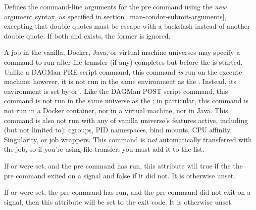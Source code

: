\begin{description}
\item[\AdAttr{PreArguments}:] Defines the command-line arguments for the
pre command using the \emph{new} argument syntax, as specified in
section~\ref{man-condor-submit-arguments}, excepting that double quotes must
be escape with a backslash instead of another double quote. If both
 and  exists, the former is ignored.

\label{PreCmd}
\item[\AdAttr{PreCmd}:] A job in the vanilla, Docker, Java, or virtual machine
universes may specify a command to run after file transfer (if any) completes
but before the  is started. Unlike a DAGMan PRE script
command, this command \emph{is} run on the execute machine; however, it
is not run in the same environment as the .  Instead,
its environment is set by  or .  Like
the DAGMan POST script command, this command is not run in the same universe
as the ; in particular, this command is not run in a
Docker container, nor in a virtual machine, nor in Java.  This command is
also not run with any of vanilla universe's features active, including (but
not limited to): cgroups, PID namespaces, bind mounts, CPU affinity,
Singularity, or job wrappers. This command is \emph{not}
automatically transferred with the job, so if you're using file transfer,
you must add it to the  list.

\item[\AdAttr{PreCmdExitBySignal}:] If  or
 were set, and the pre command has run,
this attribute will true if the the pre command exited on a signal and
false if it did not.  It is otherwise unset.

\item[\AdAttr{PreCmdExitCode}:] If  or
 were set, the pre command has run,
and the pre command did not exit on a signal, then this attribute will
be set to the exit code.  It is otherwise unset.


\end{description}
